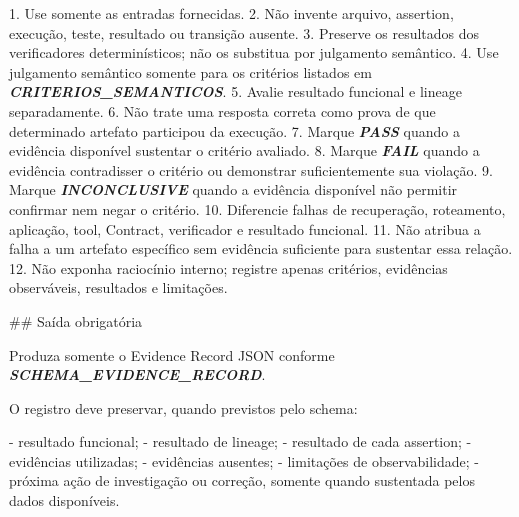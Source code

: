 \documentclass[
  10pt,
  a4paper,
  oneside]{book}
\newenvironment{Shaded}{}{}
\newcommand{\FunctionTok}[1]{\textcolor[rgb]{0.02,0.16,0.49}{#1}}
\newcommand{\InformationTok}[1]{\textcolor[rgb]{0.38,0.63,0.69}{\textbf{\textit{#1}}}}
\newcommand{\NormalTok}[1]{#1}
\newcommand{\SpecialStringTok}[1]{\textcolor[rgb]{0.73,0.40,0.53}{#1}}
\renewenvironment{Shaded}{\begin{snugshade}}{\end{snugshade}}%
\begin{document}
\begin{Shaded}
\begin{Highlighting}[]
\SpecialStringTok{1. }\NormalTok{Use somente as entradas fornecidas.}
\SpecialStringTok{2. }\NormalTok{Não invente arquivo, assertion, execução, teste, resultado ou transição ausente.}
\SpecialStringTok{3. }\NormalTok{Preserve os resultados dos verificadores determinísticos; não os substitua por julgamento semântico.}
\SpecialStringTok{4. }\NormalTok{Use julgamento semântico somente para os critérios listados em }\InformationTok{\textasciigrave{}CRITERIOS\_SEMANTICOS\textasciigrave{}}\NormalTok{.}
\SpecialStringTok{5. }\NormalTok{Avalie resultado funcional e lineage separadamente.}
\SpecialStringTok{6. }\NormalTok{Não trate uma resposta correta como prova de que determinado artefato participou da execução.}
\SpecialStringTok{7. }\NormalTok{Marque }\InformationTok{\textasciigrave{}PASS\textasciigrave{}}\NormalTok{ quando a evidência disponível sustentar o critério avaliado.}
\SpecialStringTok{8. }\NormalTok{Marque }\InformationTok{\textasciigrave{}FAIL\textasciigrave{}}\NormalTok{ quando a evidência contradisser o critério ou demonstrar suficientemente sua violação.}
\SpecialStringTok{9. }\NormalTok{Marque }\InformationTok{\textasciigrave{}INCONCLUSIVE\textasciigrave{}}\NormalTok{ quando a evidência disponível não permitir confirmar nem negar o critério.}
\SpecialStringTok{10. }\NormalTok{Diferencie falhas de recuperação, roteamento, aplicação, tool, Contract, verificador e resultado funcional.}
\SpecialStringTok{11. }\NormalTok{Não atribua a falha a um artefato específico sem evidência suficiente para sustentar essa relação.}
\SpecialStringTok{12. }\NormalTok{Não exponha raciocínio interno; registre apenas critérios, evidências observáveis, resultados e limitações.}

\FunctionTok{\#\# Saída obrigatória}

\NormalTok{Produza somente o Evidence Record JSON conforme }\InformationTok{\textasciigrave{}SCHEMA\_EVIDENCE\_RECORD\textasciigrave{}}\NormalTok{.}

\NormalTok{O registro deve preservar, quando previstos pelo schema:}

\SpecialStringTok{{-} }\NormalTok{resultado funcional;}
\SpecialStringTok{{-} }\NormalTok{resultado de lineage;}
\SpecialStringTok{{-} }\NormalTok{resultado de cada assertion;}
\SpecialStringTok{{-} }\NormalTok{evidências utilizadas;}
\SpecialStringTok{{-} }\NormalTok{evidências ausentes;}
\SpecialStringTok{{-} }\NormalTok{limitações de observabilidade;}
\SpecialStringTok{{-} }\NormalTok{próxima ação de investigação ou correção, somente quando sustentada pelos dados disponíveis.}
\end{Highlighting}
\end{Shaded}
\end{document}
